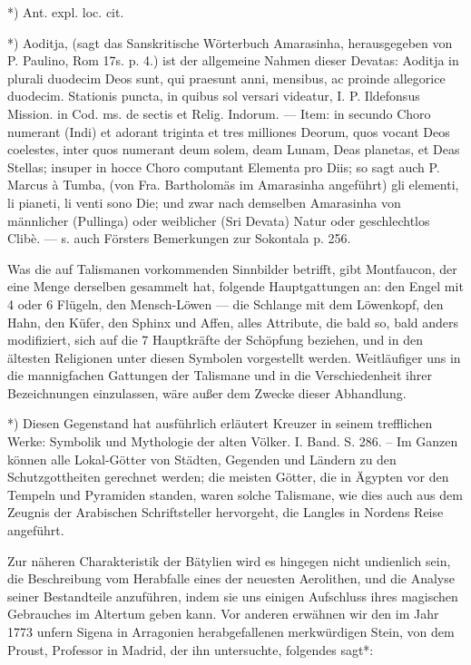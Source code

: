 \documentclass[a4paper, 11pt, oneside, polutonikogreek, german]{article}
\begin{document}
*) Ant. expl. loc. cit.

*) Aoditja, (sagt das Sanskritische Wörterbuch Amarasinha, herausgegeben von P. Paulino, Rom 17s. p. 4.) ist der allgemeine Nahmen dieser Devatas: Aoditja in plurali duodecim Deos sunt, qui praesunt anni, mensibus, ac proinde allegorice duodecim. Stationis puncta, in quibus sol versari videatur, I. P. Ildefonsus Mission. in Cod. ms. de sectis et Relig. Indorum. --- Item: in secundo Choro numerant (Indi) et adorant triginta et tres milliones Deorum, quos vocant Deos coelestes, inter quos numerant deum solem, deam Lunam, Deas planetas, et Deas Stellas; insuper in hocce Choro computant Elementa pro Diis; so sagt auch P. Marcus à Tumba, (von Fra. Bartholomäs im Amarasinha angeführt) gli elementi, li pianeti, li venti sono Die; und zwar nach demselben Amarasinha von männlicher (Pullinga) oder weiblicher (Sri Devata) Natur oder geschlechtlos Clibè. --- s. auch Försters Bemerkungen zur Sokontala p. 256.

Was die auf Talismanen vorkommenden Sinnbilder betrifft, gibt Montfaucon, der eine Menge derselben gesammelt hat, folgende Hauptgattungen an: den Engel mit 4 oder 6 Flügeln, den Mensch-Löwen --- die Schlange mit dem Löwenkopf, den Hahn, den Küfer, den Sphinx und Affen, alles Attribute, die bald so, bald anders modifiziert, sich auf die 7 Hauptkräfte der Schöpfung beziehen, und in den ältesten Religionen unter diesen Symbolen vorgestellt werden. Weitläufiger uns in die mannigfachen Gattungen der Talismane und in die Verschiedenheit ihrer Bezeichnungen einzulassen, wäre außer dem Zwecke dieser Abhandlung.

*) Diesen Gegenstand hat ausführlich erläutert Kreuzer in seinem trefflichen Werke: Symbolik und Mythologie der alten Völker. I. Band. S. 286. -- Im Ganzen können alle Lokal-Götter von Städten, Gegenden und Ländern zu den Schutzgottheiten gerechnet werden; die meisten Götter, die in Ägypten vor den Tempeln und Pyramiden standen, waren solche Talismane, wie dies auch aus dem Zeugnis der Arabischen Schriftsteller hervorgeht, die Langles in Nordens Reise angeführt.

Zur näheren Charakteristik der Bätylien wird es hingegen nicht undienlich sein, die Beschreibung vom Herabfalle eines der neuesten Aerolithen, und die Analyse seiner Bestandteile anzuführen, indem sie uns einigen Aufschluss ihres magischen Gebrauches im Altertum geben kann. Vor anderen erwähnen wir den im Jahr 1773 unfern Sigena in Arragonien herabgefallenen merkwürdigen Stein, von dem Proust, Professor in Madrid, der ihn untersuchte, folgendes sagt*:
\end{document}
